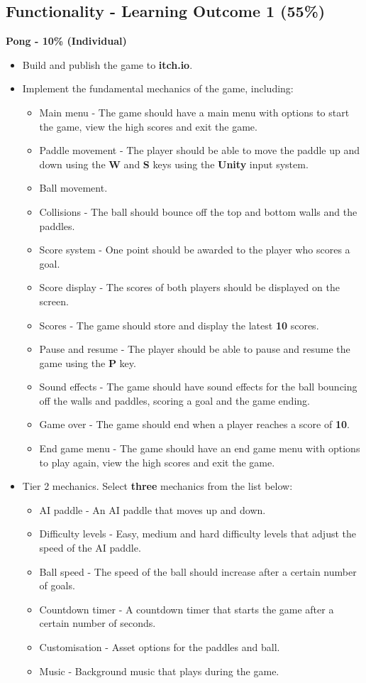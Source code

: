 \documentclass{article}
\begin{document}
\subsection*{Functionality - Learning Outcome 1 (55\%)}
\textbf{Pong - 10\% (Individual)}
\begin{itemize}
    \item Build and publish the game to \textbf{itch.io}.
	\item Implement the fundamental mechanics of the game, including:
	\begin{itemize}
        \item Main menu - The game should have a main menu with options to start the game, view the high scores and exit the game.
        \item Paddle movement - The player should be able to move the paddle up and down using the \textbf{W} and \textbf{S} keys using the \textbf{Unity} input system.
        \item Ball movement.
        \item Collisions - The ball should bounce off the top and bottom walls and the paddles.
        \item Score system - One point should be awarded to the player who scores a goal.
        \item Score display - The scores of both players should be displayed on the screen.
        \item Scores - The game should store and display the latest \textbf{10} scores. 
        \item Pause and resume - The player should be able to pause and resume the game using the \textbf{P} key.
        \item Sound effects - The game should have sound effects for the ball bouncing off the walls and paddles, scoring a goal and the game ending.
        \item Game over - The game should end when a player reaches a score of \textbf{10}.
        \item End game menu - The game should have an end game menu with options to play again, view the high scores and exit the game.
    \end{itemize}
    
    \item Tier 2 mechanics. Select \textbf{three} mechanics from the list below:
    \begin{itemize}
        \item AI paddle - An AI paddle that moves up and down.
        \item Difficulty levels - Easy, medium and hard difficulty levels that adjust the speed of the AI paddle.
        \item Ball speed - The speed of the ball should increase after a certain number of goals.
        \item Countdown timer - A countdown timer that starts the game after a certain number of seconds.
        \item Customisation - Asset options for the paddles and ball.
        \item Music - Background music that plays during the game.
    \end{itemize}


\end{itemize}
\end{document}
